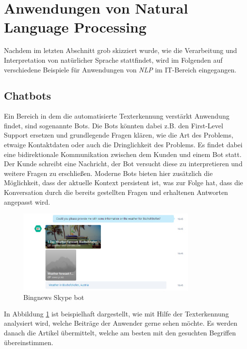 \section{Anwendungen von Natural Language Processing}
Nachdem im letzten Abschnitt grob skizziert wurde, wie die Verarbeitung und Interpretation von natürlicher Sprache stattfindet, wird im Folgenden auf verschiedene Beispiele für Anwendungen von \textit{NLP} im IT-Bereich eingegangen.

\subsection{Chatbots}
Ein Bereich in dem die automatisierte Texterkennung verstärkt Anwendung findet, sind sogenannte Bots. Die Bots könnten dabei z.B. den First-Level Support ersetzen und grundlegende Fragen klären, wie die Art des Problems, etwaige Kontaktdaten oder auch die Dringlichkeit des Problems. Es findet dabei eine bidirektionale Kommunikation zwischen dem Kunden und einem Bot statt. Der Kunde schreibt eine Nachricht, der Bot versucht diese zu interpretieren und weitere Fragen zu erschließen. Moderne Bots bieten hier zusätzlich die Möglichkeit, dass der aktuelle Kontext persistent ist, was zur Folge hat, dass die Konversation durch die bereits gestellten Fragen und erhaltenen Antworten angepasst wird. 

\begin{figure}[ht]
	\centering
		\includegraphics[width=0.80\textwidth]{images/chatbot.PNG}
	\caption{Bingnews Skype bot}
	\label{fig:chatbot}
\end{figure}

In Abbildung \ref{fig:chatbot} ist beispielhaft dargestellt, wie mit Hilfe der Texterkennung analysiert wird, welche Beiträge der Anwender gerne sehen möchte. Es werden danach die Artikel übermittelt, welche am besten mit den gesuchten Begriffen übereinstimmen. 

